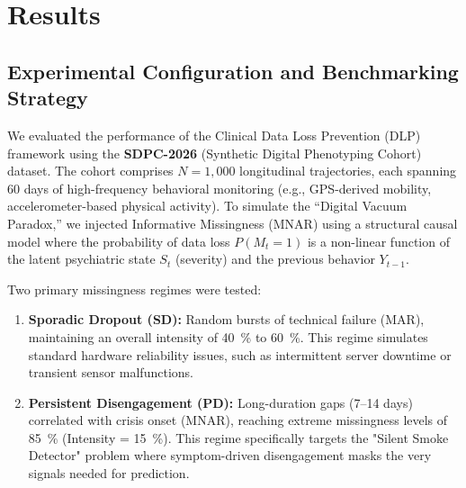 \section{Results}

\subsection{Experimental Configuration and Benchmarking Strategy}
We evaluated the performance of the Clinical Data Loss Prevention (DLP) framework using the \textbf{SDPC-2026} (Synthetic Digital Phenotyping Cohort) dataset. The cohort comprises $N=1,000$ longitudinal trajectories, each spanning 60 days of high-frequency behavioral monitoring (e.g., GPS-derived mobility, accelerometer-based physical activity). To simulate the ``Digital Vacuum Paradox,'' we injected Informative Missingness (MNAR) using a structural causal model where the probability of data loss $P(M_t=1)$ is a non-linear function of the latent psychiatric state $S_t$ (severity) and the previous behavior $Y_{t-1}$.

Two primary missingness regimes were tested:
\begin{enumerate}
    \item \textbf{Sporadic Dropout (SD):} Random bursts of technical failure (MAR), maintaining an overall intensity of \SI{40}{\percent} to \SI{60}{\percent}. This regime simulates standard hardware reliability issues, such as intermittent server downtime or transient sensor malfunctions.
    \item \textbf{Persistent Disengagement (PD):} Long-duration gaps (7--14 days) correlated with crisis onset (MNAR), reaching extreme missingness levels of \SI{85}{\percent} (Intensity = \SI{15}{\percent}). This regime specifically targets the "Silent Smoke Detector" problem where symptom-driven disengagement masks the very signals needed for prediction.
\end{enumerate}

